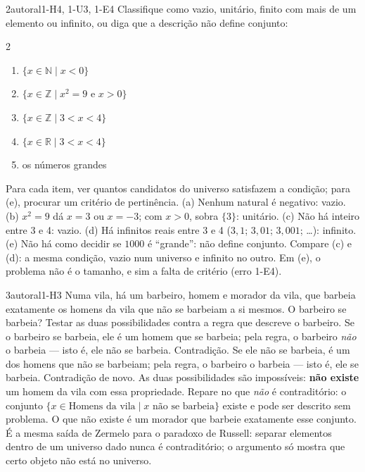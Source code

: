 \begin{exemplo}{}{2}{autoral}{1-H4, 1-U3, 1-E4}
\label{ex:u1:classificar}
Classifique como vazio, unitário, finito com mais de um elemento ou infinito, ou diga que a descrição não define conjunto:
\begin{multicols}{2}
\begin{enumerate}[label=\alph*)]
  \item $\{x\in\mathbb{N}\mid x<0\}$
  \item $\{x\in\mathbb{Z}\mid x^2=9\text{ e }x>0\}$
  \item $\{x\in\mathbb{Z}\mid 3<x<4\}$
  \item $\{x\in\mathbb{R}\mid 3<x<4\}$
  \item os números grandes
\end{enumerate}
\end{multicols}
\plano Para cada item, ver quantos candidatos do universo satisfazem a condição; para (e), procurar um critério de pertinência.
\resolucao (a) Nenhum natural é negativo: vazio. (b) $x^2=9$ dá $x=3$ ou $x=-3$; com $x>0$, sobra $\{3\}$: unitário. (c) Não há inteiro entre 3 e 4: vazio. (d) Há infinitos reais entre 3 e 4 ($3{,}1$; $3{,}01$; $3{,}001$; \ldots): infinito. (e) Não há como decidir se $1000$ é \enquote{grande}: não define conjunto.
\comentario Compare (c) e (d): a mesma condição, vazio num universo e infinito no outro. Em (e), o problema não é o tamanho, e sim a falta de critério (erro 1-E4).
\end{exemplo}

\begin{exemplo}{}{3}{autoral}{1-H3}
\label{ex:u1:barbeiro}
Numa vila, há um barbeiro, homem e morador da vila, que barbeia exatamente os homens da vila que não se barbeiam a si mesmos. O barbeiro se barbeia?
\plano Testar as duas possibilidades contra a regra que descreve o barbeiro.
\resolucao Se o barbeiro se barbeia, ele é um homem que se barbeia; pela regra, o barbeiro \emph{não} o barbeia — isto é, ele não se barbeia. Contradição. Se ele não se barbeia, é um dos homens que não se barbeiam; pela regra, o barbeiro o barbeia — isto é, ele se barbeia. Contradição de novo. As duas possibilidades são impossíveis: \textbf{não existe} um homem da vila com essa propriedade.
\comentario Repare no que \emph{não} é contraditório: o conjunto $\{x\in\text{Homens da vila}\mid x\text{ não se barbeia}\}$ existe e pode ser descrito sem problema. O que não existe é um morador que barbeie exatamente esse conjunto. É a mesma saída de Zermelo para o paradoxo de Russell: separar elementos dentro de um universo dado nunca é contraditório; o argumento só mostra que certo objeto não está no universo.
\end{exemplo}

